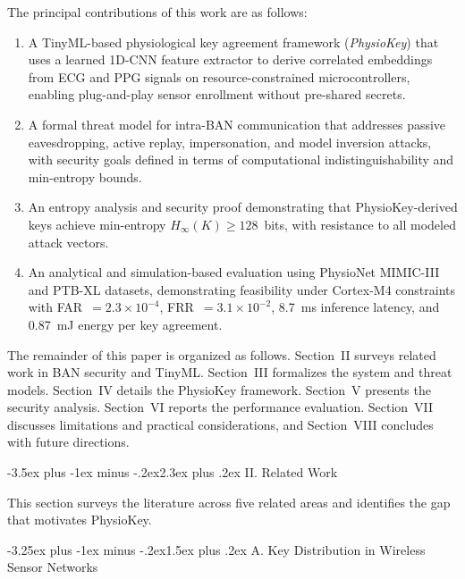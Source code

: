 \documentclass[10pt,twocolumn]{article}
\makeatletter
\renewcommand{\section}{\@startsection{section}{1}{\z@}%
  {-3.5ex plus -1ex minus -.2ex}{2.3ex plus .2ex}%
  {\normalfont\large\bfseries\centering}}
\renewcommand{\subsection}{\@startsection{subsection}{2}{\z@}%
  {-3.25ex plus -1ex minus -.2ex}{1.5ex plus .2ex}%
  {\normalfont\normalsize\bfseries\itshape}}
\makeatother
\begin{document}
The principal contributions of this work are as follows:

\begin{enumerate}
    \item A TinyML-based physiological key agreement framework (\textit{PhysioKey}) that uses a learned 1D-CNN feature extractor to derive correlated embeddings from ECG and PPG signals on resource-constrained microcontrollers, enabling plug-and-play sensor enrollment without pre-shared secrets.

    \item A formal threat model for intra-BAN communication that addresses passive eavesdropping, active replay, impersonation, and model inversion attacks, with security goals defined in terms of computational indistinguishability and min-entropy bounds.

    \item An entropy analysis and security proof demonstrating that PhysioKey-derived keys achieve min-entropy $H_{\infty}(K) \geq 128$~bits, with resistance to all modeled attack vectors.

    \item An analytical and simulation-based evaluation using PhysioNet MIMIC-III and PTB-XL datasets, demonstrating feasibility under Cortex-M4 constraints with FAR~$= 2.3 \times 10^{-4}$, FRR~$= 3.1 \times 10^{-2}$, 8.7~ms inference latency, and 0.87~mJ energy per key agreement.
\end{enumerate}

The remainder of this paper is organized as follows. Section~II surveys related work in BAN security and TinyML. Section~III formalizes the system and threat models. Section~IV details the PhysioKey framework. Section~V presents the security analysis. Section~VI reports the performance evaluation. Section~VII discusses limitations and practical considerations, and Section~VIII concludes with future directions.


\section{II. Related Work}
\label{sec:related}

This section surveys the literature across five related areas and identifies the gap that motivates PhysioKey.

\subsection{A. Key Distribution in Wireless Sensor Networks}
\label{subsec:key_dist}
\end{document}
